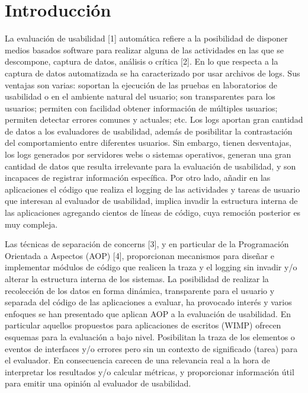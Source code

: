 \section{Introducción}
\label{sec:intro}

La evaluación de usabilidad [1] automática refiere a la posibilidad de disponer medios basados software para realizar alguna de las actividades en las que se descompone, captura de datos, análisis o crítica [2]. En lo que respecta a la captura de datos automatizada se ha caracterizado por usar archivos de logs. Sus ventajas son varias: soportan la ejecución de las pruebas en laboratorios de usabilidad o en el ambiente natural del usuario; son transparentes para los usuarios; permiten con facilidad obtener información de múltiples usuarios; permiten detectar errores comunes y actuales; etc. Los logs aportan gran cantidad de datos a los evaluadores de usabilidad, además de posibilitar la contrastación del comportamiento entre diferentes usuarios. Sin embargo, tienen desventajas, los logs generados por servidores webs o sistemas operativos, generan una gran cantidad de datos que resulta irrelevante para la evaluación de usabilidad, y son incapaces de registrar información específica. Por otro lado, añadir en las aplicaciones el código que realiza el logging de las actividades y  tareas de usuario que interesan al evaluador de usabilidad, implica invadir la estructura interna de las aplicaciones agregando cientos de líneas de código, cuya remoción posterior es muy compleja.

Las técnicas de separación de concerns [3], y en particular de la Programación Orientada a Aspectos (AOP) [4], proporcionan mecanismos para diseñar e implementar módulos de código que realicen la traza y el logging sin invadir y/o alterar la estructura interna de los sistemas. La posibilidad de realizar la recolección de los datos en forma dinámica, transparente para el usuario y separada del código de las aplicaciones a evaluar, ha provocado interés y varios enfoques se han presentado que aplican AOP a la evaluación de usabilidad. En particular aquellos propuestos para aplicaciones de escritos (WIMP) ofrecen esquemas para la evaluación a bajo nivel. Posibilitan la traza de los elementos o eventos de interfaces y/o errores pero sin un contexto de significado (tarea) para el evaluador. En consecuencia carecen de una relevancia real a la hora de interpretar los resultados y/o calcular métricas, y proporcionar información útil para emitir una opinión al evaluador de usabilidad. 

